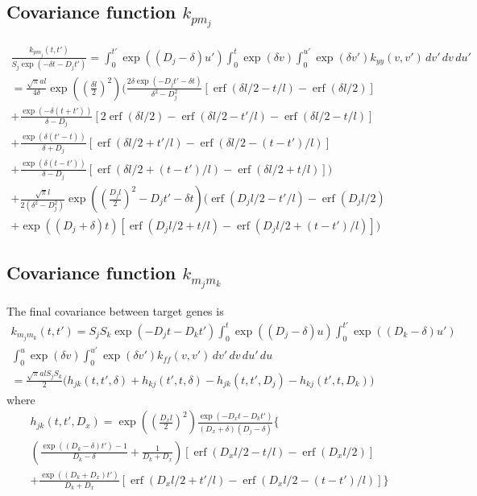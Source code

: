 \documentclass{article}
\newcommand{\erf}{\operatorname{erf}}
\begin{document}
\subsection{Covariance function $k_{pm_j}$}

\begin{multline}
  \frac{k_{p m_j}(t, t')}{S_j \exp(-\delta t - D_j t')} = 
  \int_0^{t'} \exp((D_j - \delta) u') \int_0^t \exp(\delta v) \int_0^{u'}
  \exp(\delta v') k_{yy}(v, v')\, dv'\, dv\, du' \\
  = 
  \frac{\sqrt{\pi}al}{4\delta}\exp\left(\left(\frac{\delta l}{2}\right)^2\right)
  \bigg(
  \frac{2 \delta \exp(- D_j t' - \delta t)}{\delta^2 - D_j^2}
  [\erf(\delta l / 2 - t/l) - \erf(\delta l / 2)]\\
  +
  \frac{\exp(- \delta (t + t'))}{\delta - D_j}
  [2\erf(\delta l / 2) - \erf(\delta l / 2 - t'/l) - \erf(\delta l / 2 - t/l)] \\
  +
  \frac{\exp(\delta (t' - t))}{\delta + D_j}
  [\erf(\delta l / 2 + t'/l) - \erf(\delta l / 2 - (t-t')/l)]\\
  +
  \frac{\exp(\delta (t - t'))}{\delta - D_j}
  [\erf(\delta l / 2 + (t-t')/l) - \erf(\delta l / 2 + t/l)]
  \bigg) \\
  + \frac{\sqrt{\pi}l}{2(\delta^2 - D_j^2)}
  \exp\left(\left(\frac{D_j l}{2}\right)^2 - D_j t' - \delta t \right)
  \bigg(
  \erf(D_j l/2 - t'/l) - \erf(D_j l/2) \\
  + \exp((D_j + \delta) t) [\erf(D_j l/2 + t/l) - \erf(D_j l/2 + (t-t')/l)]
  \bigg)
\end{multline}

\subsection{Covariance function $k_{m_j m_k}$}

The final covariance between target genes is
\begin{multline}
  k_{m_j m_k}(t, t') = S_j S_k \exp(-D_j t - D_k t')
  \int_0^t \exp((D_j - \delta) u)
  \int_0^{t'} \exp((D_k - \delta) u') \\
  \int_0^u \exp(\delta v) \int_0^{u'} \exp(\delta v') k_{ff}(v, v') \, dv'\, dv\, du'\, du \\
  = \frac{\sqrt{\pi} a l S_j S_k}{2} \bigg(
  h_{jk}(t, t', \delta) + h_{kj}(t', t, \delta) 
  - h_{jk}(t, t', D_j) - h_{kj}(t', t, D_k)
  \bigg)
\end{multline}
where
\begin{multline}
  h_{jk}(t, t', D_x) = 
  \exp\left(\left(\frac{D_x l}{2}\right)^2\right)
  \frac{\exp(-D_x t - D_k t')}{(D_x + \delta) (D_j - \delta)}
  \bigg\{ 
   \\
  \left(\frac{\exp((D_k-\delta) t') - 1}{D_k-\delta} +
    \frac{1}{D_k + D_x} \right)
  [\erf(D_x l/2 - t/l) - \erf(D_x l/2)]
  \\
  + \frac{\exp((D_k+D_x)t')}{D_k+D_x}
  [\erf(D_x l/2 + t'/l)
  - \erf(D_x l/2 - (t-t')/l)]
  \bigg\} \\
\end{multline}




\end{document}
